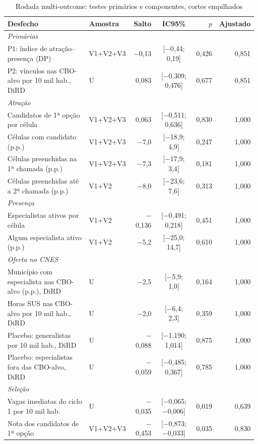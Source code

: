 \documentclass[11pt,a4paper]{article}
\begin{document}
\begin{table}[htbp]
\centering
\footnotesize
\setlength{\tabcolsep}{2.5pt}
\caption{Rodada multi-outcome: testes primários e componentes, cortes empilhados}
\label{tab:bolsa_multi}
\begin{tabular}{llrcrr}
\toprule
Desfecho & Amostra & Salto & IC95\% & $p$ & Ajustado \\
\midrule
\textit{Primárias} & & & & & \\
P1: índice de atração--presença (DP) & V1+V2+V3 & $-$0,13 & [$-$0,44; 0,19] & 0,426 & 0,851 \\
P2: vínculos nas CBO-alvo por 10 mil hab., DiRD & U & 0,083 & [$-$0,309; 0,476] & 0,677 & 0,851 \\
\textit{Atração} & & & & & \\
Candidatos de 1ª opção por célula & V1+V2+V3 & 0,063 & [$-$0,511; 0,636] & 0,830 & 1,000 \\
Células com candidato (p.p.) & V1+V2+V3 & $-$7,0 & [$-$18,9; 4,9] & 0,247 & 1,000 \\
Células preenchidas na 1ª chamada (p.p.) & V1+V2+V3 & $-$7,3 & [$-$17,9; 3,4] & 0,181 & 1,000 \\
Células preenchidas até a 2ª chamada (p.p.) & V1+V2 & $-$8,0 & [$-$23,6; 7,6] & 0,313 & 1,000 \\
\textit{Presença} & & & & & \\
Especialistas ativos por célula & V1+V2 & $-$0,136 & [$-$0,491; 0,218] & 0,451 & 1,000 \\
Algum especialista ativo (p.p.) & V1+V2 & $-$5,2 & [$-$25,0; 14,7] & 0,610 & 1,000 \\
\textit{Oferta no CNES} & & & & & \\
Município com especialista nas CBO-alvo (p.p.), DiRD & U & $-$2,5 & [$-$5,9; 1,0] & 0,164 & 1,000 \\
Horas SUS nas CBO-alvo por 10 mil hab., DiRD & U & $-$2,0 & [$-$6,4; 2,3] & 0,359 & 1,000 \\
Placebo: generalistas por 10 mil hab., DiRD & U & $-$0,088 & [$-$1,190; 1,014] & 0,875 & 1,000 \\
Placebo: especialistas fora das CBO-alvo, DiRD & U & $-$0,059 & [$-$0,485; 0,367] & 0,785 & 1,000 \\
\textit{Seleção} & & & & & \\
Vagas imediatas do ciclo 1 por 10 mil hab. & U & $-$0,035 & [$-$0,065; $-$0,006] & 0,019 & 0,639 \\
Nota dos candidatos de 1ª opção & V1+V2+V3 & $-$0,453 & [$-$0,873; $-$0,033] & 0,035 & 0,830 \\
\bottomrule
\end{tabular}


\end{table}
\end{document}
